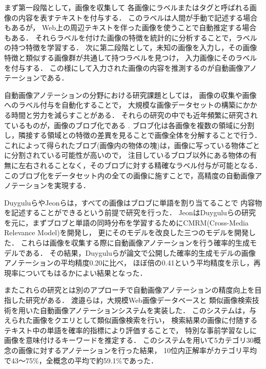 \documentclass{deimj}
\begin{document}
まず第一段階として，画像を収集して
各画像にラベルまたはタグと呼ばれる画像の内容を表すテキストを付与する．
このラベルは人間が手動で記述する場合もあるが，
Web上の周辺テキストを伴った画像を使うことで自動推定する場合もある．
それらラベルを付けた画像の特徴を統計的に分析することで，ラベルの持つ特徴を学習する．
次に第二段階として，未知の画像を入力し，その画像特徴と類似する画像群が共通して持つラベルを見つけ，
入力画像にそのラベルを付与する．
この様にして入力された画像の内容を推測するのが自動画像アノテーションである．

自動画像アノテーションの分野における研究課題としては，
画像の収集や画像へのラベル付与を自動化することで，
大規模な画像データセットの構築にかかる時間と労力を減らすことがある．
%
それらの研究の中でも近年頻繁に研究されているものが，画像のブロブ化である
\cite{duygulu,jeon}.
ブロブ化は各画像を複数の領域に分割し，隣接する領域との特徴の差異を見ることで画像全体を分解することで行う．
これによって得られたブロブ(画像内の物体の塊)は，画像に写っている物体ごとに分割されている可能性が高いので，
注目しているブロブ以外にある物体の有無に左右されることなく，そのブロブに対する精確なラベル付与が可能となる．
このブロブ化をデータセット内の全ての画像に施すことで，高精度の自動画像アノテーションを実現する．

Duygulu\cite{duygulu}らやJeon\cite{jeon}らは，すべての画像はブロブに単語を割り当てることで
内容物を記述することができるという前提で研究を行った．
JeonはDuyguluらの研究を元に，まずブロブと単語の同時分布を学習するためにCMRM(Cross-Media Relevance Model)を開発し，
更にそのモデルを改良した三つのモデルを開発した．
これらは画像を収集する際に自動画像アノテーションを行う確率的生成モデルである．
その結果，Duyguluらが論文で公開した確率的生成モデルの画像アノテーションの平均精度0.20に比べ，
ほぼ倍の0.41という平均精度を示し，再現率についてもはるかによい結果となった．

またこれらの研究とは別のアプローチで自動画像アノテーションの精度向上を目指した研究がある．
渡邉ら\cite{watanabe}は，大規模Web画像データベースと
類似画像検索技術を用いた自動画像アノテーションシステムを実装した．
このシステムは，与えられた画像をクエリとして類似画像検索を行い，
検索結果の画像に付随するテキスト中の単語を確率的指標により評価することで，
特別な事前学習なしに画像を意味付けるキーワードを推定する．
このシステムを用いて5カテゴリ30概念の画像に対するアノテーションを行った結果，
10位内正解率がカテゴリ平均で43～75\%，全概念の平均で約59.1\%であった．
\end{document}
